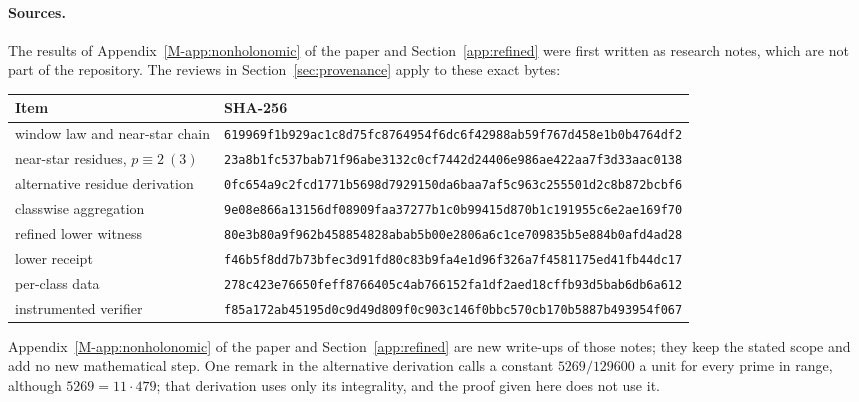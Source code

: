 \documentclass[11pt]{article}
\theoremstyle{remark}
\numberwithin{equation}{section}
\begin{document}
\paragraph{Sources.} The results of Appendix~\ref{M-app:nonholonomic} of the paper and Section~\ref{app:refined} were first written as research notes, which are not part of the repository. The reviews in Section~\ref{sec:provenance} apply to these exact bytes:
\begin{center}\footnotesize
\begin{tabular}{@{}ll@{}}
\toprule
Item & SHA-256\\
\midrule
window law and near-star chain & \texttt{619969f1b929ac1c8d75fc8764954f6dc6f42988ab59f767d458e1b0b4764df2}\\
near-star residues, $p\equiv2\ (3)$ & \texttt{23a8b1fc537bab71f96abe3132c0cf7442d24406e986ae422aa7f3d33aac0138}\\
alternative residue derivation & \texttt{0fc654a9c2fcd1771b5698d7929150da6baa7af5c963c255501d2c8b872bcbf6}\\
classwise aggregation & \texttt{9e08e866a13156df08909faa37277b1c0b99415d870b1c191955c6e2ae169f70}\\
refined lower witness & \texttt{80e3b80a9f962b458854828abab5b00e2806a6c1ce709835b5e884b0afd4ad28}\\
lower receipt & \texttt{f46b5f8dd7b73bfec3d91fd80c83b9fa4e1d96f326a7f4581175ed41fb44dc17}\\
per-class data & \texttt{278c423e76650feff8766405c4ab766152fa1df2aed18cffb93d5bab6db6a612}\\
instrumented verifier & \texttt{f85a172ab45195d0c9d49d809f0c903c146f0bbc570cb170b5887b493954f067}\\
\bottomrule
\end{tabular}
\end{center}
Appendix~\ref{M-app:nonholonomic} of the paper and Section~\ref{app:refined} are new write-ups of those notes; they keep the stated scope and add no new mathematical step. One remark in the alternative derivation calls a constant $5269/129600$ a unit for every prime in range, although $5269=11\cdot479$; that derivation uses only its integrality, and the proof given here does not use it.
\end{document}
